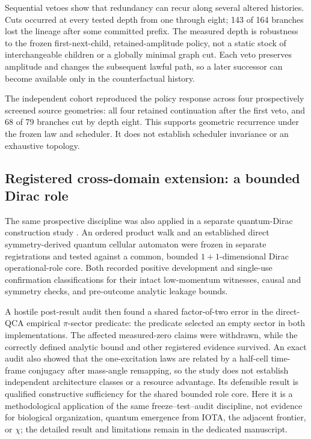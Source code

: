 Sequential vetoes show that redundancy can recur along several altered
histories. Cuts occurred at every tested depth from one through eight; 143 of
164 branches lost the lineage after some committed prefix. The measured depth
is robustness to the frozen first-next-child, retained-amplitude policy, not a
static stock of interchangeable children or a globally minimal graph cut. Each
veto preserves amplitude and changes the subsequent lawful path, so a later
successor can become available only in the counterfactual history.

The independent cohort reproduced the policy response across four prospectively
screened source geometries: all four retained continuation after the first veto,
and 68 of 79 branches cut by depth eight. This supports geometric recurrence
under the frozen law and scheduler. It does not establish scheduler invariance
or an exhaustive topology.

\subsection{Registered cross-domain extension: a bounded Dirac role}

The same prospective discipline was also applied in a separate quantum-Dirac
construction study \cite{clark2026quantumdirac}. An ordered product walk and an
established direct symmetry-derived quantum cellular automaton were frozen in
separate registrations and tested against a common, bounded $1+1$-dimensional
Dirac operational-role core. Both recorded positive development and single-use
confirmation classifications for their intact low-momentum witnesses, causal
and symmetry checks, and pre-outcome analytic leakage bounds.

A hostile post-result audit then found a shared factor-of-two error in the
direct-QCA empirical $\pi$-sector predicate: the predicate selected an empty
sector in both implementations. The affected measured-zero claims were
withdrawn, while the correctly defined analytic bound and other registered
evidence survived. An exact audit also showed that the one-excitation laws are
related by a half-cell time-frame conjugacy after mass-angle remapping, so the
study does not establish independent architecture classes or a resource
advantage. Its defensible result is qualified constructive sufficiency for the
shared bounded role core. Here it is a methodological application of the same
freeze--test--audit discipline, not evidence for biological organization,
quantum emergence from IOTA, the adjacent frontier, or $\chi$; the detailed
result and limitations remain in the dedicated manuscript.

